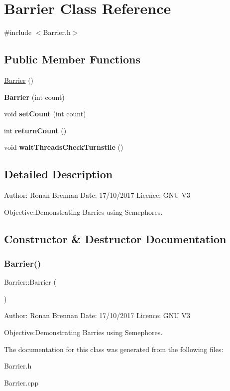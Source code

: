\hypertarget{class_barrier}{}\section{Barrier Class Reference}
\label{class_barrier}


{\ttfamily \#include $<$Barrier.\+h$>$}

\subsection*{Public Member Functions}
\begin{DoxyCompactItemize}
\item 
\mbox{\hyperlink{class_barrier_a462a2435e07b6fabc0265011f03310ee}{Barrier}} ()
\item 
\mbox{\label{class_barrier_a68730c862911d37696957056595aa604}} 
{\bfseries Barrier} (int count)
\item 
\mbox{\label{class_barrier_ab999e172844330d8b9a1c13f3766959d}} 
void {\bfseries set\+Count} (int count)
\item 
\mbox{\label{class_barrier_a82ee76a57dfed3bd25bbe7f63c8ca0e0}} 
int {\bfseries return\+Count} ()
\item 
\mbox{\label{class_barrier_a892a22d2f2629311ea5af92458588b79}} 
void {\bfseries wait\+Threads\+Check\+Turnstile} ()
\end{DoxyCompactItemize}


\subsection{Detailed Description}
Author\+: Ronan Brennan Date\+: 17/10/2017 Licence\+: G\+NU V3

Objective\+:Demonstrating Barries using Semephores. 

\subsection{Constructor \& Destructor Documentation}
\mbox{\label{class_barrier_a462a2435e07b6fabc0265011f03310ee}} 
\subsubsection{\texorpdfstring{Barrier()}{Barrier()}}
{\footnotesize\ttfamily Barrier\+::\+Barrier (\begin{DoxyParamCaption}{ }\end{DoxyParamCaption})}

Author\+: Ronan Brennan Date\+: 17/10/2017 Licence\+: G\+NU V3

Objective\+:Demonstrating Barries using Semephores. 

The documentation for this class was generated from the following files\+:\begin{DoxyCompactItemize}
\item 
Barrier.\+h\item 
Barrier.\+cpp\end{DoxyCompactItemize}
